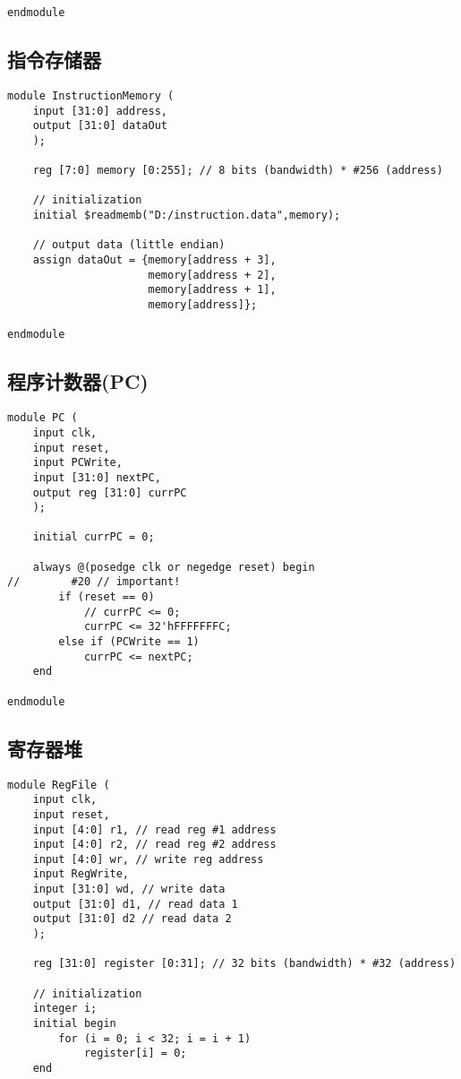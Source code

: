 \begin{multicols}{2}
\begin{lstlisting}
endmodule
\end{lstlisting}

\subsection{指令存储器}
\begin{lstlisting}
module InstructionMemory (
	input [31:0] address,
	output [31:0] dataOut
	);
	
	reg [7:0] memory [0:255]; // 8 bits (bandwidth) * #256 (address)

	// initialization
	initial $readmemb("D:/instruction.data",memory);

	// output data (little endian)
	assign dataOut = {memory[address + 3],
					  memory[address + 2],
					  memory[address + 1],
					  memory[address]};

endmodule
\end{lstlisting}

\subsection{程序计数器(PC)}
\begin{lstlisting}
module PC (
    input clk,
    input reset,
    input PCWrite,
    input [31:0] nextPC,
    output reg [31:0] currPC
    );

    initial currPC = 0;

    always @(posedge clk or negedge reset) begin
//        #20 // important!
        if (reset == 0)
            // currPC <= 0;
            currPC <= 32'hFFFFFFFC;
        else if (PCWrite == 1)
            currPC <= nextPC;
    end

endmodule
\end{lstlisting}

\subsection{寄存器堆}
\begin{lstlisting}
module RegFile (
    input clk,
    input reset,
    input [4:0] r1, // read reg #1 address
    input [4:0] r2, // read reg #2 address
    input [4:0] wr, // write reg address
    input RegWrite,
    input [31:0] wd, // write data
    output [31:0] d1, // read data 1
    output [31:0] d2 // read data 2
    );
    
    reg [31:0] register [0:31]; // 32 bits (bandwidth) * #32 (address)
    
    // initialization
    integer i;
    initial begin
        for (i = 0; i < 32; i = i + 1)
            register[i] = 0;
    end


\end{lstlisting}
\end{multicols}
